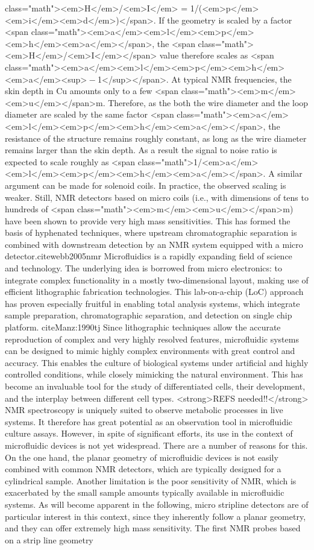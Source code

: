 class="math"><em>H</em>/<em>I</em> = 1/(<em>p</em><em>i</em><em>d</em>)</span>. If the geometry is scaled by a factor <span class="math"><em>a</em><em>l</em><em>p</em><em>h</em><em>a</em></span>, the <span class="math"><em>H</em>/<em>I</em></span> value therefore scales as <span class="math"><em>a</em><em>l</em><em>p</em><em>h</em><em>a</em><sup> − 1</sup></span>. At typical NMR frequencies, the skin depth in Cu amounts only to a few <span class="math"><em>m</em><em>u</em></span>m. Therefore, as the both the wire diameter and the loop diameter are scaled by the same factor <span class="math"><em>a</em><em>l</em><em>p</em><em>h</em><em>a</em></span>, the resistance of the structure remains roughly constant, as long as the wire diameter remains larger than the skin depth. As a result the signal to noise ratio is expected to scale roughly as <span class="math">1/<em>a</em><em>l</em><em>p</em><em>h</em><em>a</em></span>. A similar argument can be made for solenoid coils. In practice, the observed scaling is weaker. Still, NMR detectors based on micro coils (i.e., with dimensions of tens to hundreds of <span class="math"><em>m</em><em>u</em></span>m) have been shown to provide very high mass sensitivities. This has formed the basis of hyphenated techniques, where upstream chromatographic separation is combined with downstream detection by an NMR system equipped with a micro detector.cite{webb2005nmr} Microfluidics is a rapidly expanding field of science and technology. The underlying idea is borrowed from micro electronics: to integrate complex functionality in a mostly two-dimensional layout, making use of efficient lithographic fabrication technologies. This lab-on-a-chip (LoC) approach has proven especially fruitful in enabling total analysis systems, which integrate sample preparation, chromatographic separation, and detection on single chip platform. cite{Manz:1990tj} Since lithographic techniques allow the accurate reproduction of complex and very highly resolved features, microfluidic systems can be designed to mimic highly complex environments with great control and accuracy. This enables the culture of biological systems under artificial and highly controlled conditions, while closely mimicking the natural environment. This has become an invaluable tool for the study of differentiated cells, their development, and the interplay between different cell types. {<strong>REFS needed!!</strong>} NMR spectroscopy is uniquely suited to observe metabolic processes in live systems. It therefore has great potential as an observation tool in microfluidic culture assays. However, in spite of significant efforts, its use in the context of microfluidic devices is not yet widespread. There are a number of reasons for this. On the one hand, the planar geometry of microfluidic devices is not easily combined with common NMR detectors, which are typically designed for a cylindrical sample. Another limitation is the poor sensitivity of NMR, which is exacerbated by the small sample amounts typically available in microfluidic systems. As will become apparent in the following, micro stripline detectors are of particular interest in this context, since they inherently follow a planar geometry, and they can offer extremely high mass sensitivity. The first NMR probes based on a strip line geometry 